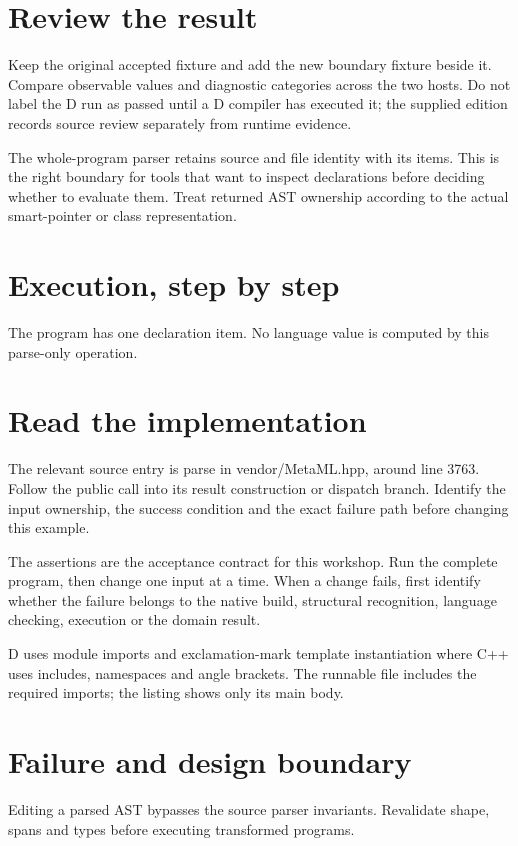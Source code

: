 \section*{Review the result}
Keep the original accepted fixture and add the new boundary fixture beside it. Compare observable values and diagnostic categories across the two hosts. Do not label the D run as passed until a D compiler has executed it; the supplied edition records source review separately from runtime evidence.

\clearpage
{}
The whole-program parser retains source and file identity with its items. This is the right boundary for tools that want to inspect declarations before deciding whether to evaluate them. Treat returned AST ownership according to the actual smart-pointer or class representation.


\section*{Execution, step by step}
The program has one declaration item. No language value is computed by this parse-only operation.

\section*{Read the implementation}
The relevant source entry is parse in vendor/MetaML.hpp, around line 3763. Follow the public call into its result construction or dispatch branch. Identify the input ownership, the success condition and the exact failure path before changing this example.

The assertions are the acceptance contract for this workshop. Run the complete program, then change one input at a time. When a change fails, first identify whether the failure belongs to the native build, structural recognition, language checking, execution or the domain result.

\clearpage
{}
D uses module imports and exclamation-mark template instantiation where C++ uses includes, namespaces and angle brackets. The runnable file includes the required imports; the listing shows only its main body.


\section*{Failure and design boundary}
Editing a parsed AST bypasses the source parser invariants. Revalidate shape, spans and types before executing transformed programs.

